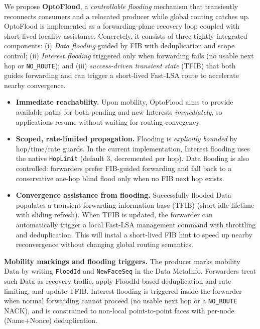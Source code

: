 We propose \textbf{OptoFlood}, a \emph{controllable flooding} mechanism that transiently reconnects consumers and a relocated producer while global routing catches up. OptoFlood is implemented as a forwarding-plane recovery loop coupled with short-lived locality assistance. Concretely, it consists of three tightly integrated components: (i) \emph{Data flooding} guided by FIB with deduplication and scope control; (ii) \emph{Interest flooding} triggered only when forwarding fails (no usable next hop or \texttt{NO\_ROUTE}); and (iii) \emph{success-driven transient state} (TFIB) that both guides forwarding and can trigger a short-lived Fast-LSA route to accelerate nearby convergence.

\begin{itemize}
  \item \textbf{Immediate reachability.} Upon mobility, OptoFlood aims to provide available paths for both pending and new Interests \emph{immediately}, so applications resume without waiting for routing convegency.
  \item \textbf{Scoped, rate-limited propagation.} Flooding is \emph{explicitly bounded} by hop/time/rate guards. In the current implementation, Interest flooding uses the native \texttt{HopLimit} (default 3, decremented per hop). Data flooding is also controlled: forwarders prefer FIB-guided forwarding and fall back to a conservative one-hop blind flood only when no FIB next hop exists.
  \item \textbf{Convergence assistance from flooding.} Successfully flooded Data populates a transient forwarding information base (TFIB) (short idle lifetime with sliding refresh). When TFIB is updated, the forwarder can automatically trigger a local Fast-LSA management command with throttling and deduplication. This will instal a short-lived FIB hint to speed up nearby reconvergence without changing global routing semantics.
\end{itemize}

\noindent\textbf{Mobility markings and flooding triggers.}
The producer marks mobility Data by writing \texttt{FloodId} and \texttt{NewFaceSeq} in the Data MetaInfo. Forwarders treat such Data as recovery traffic, apply FloodId-based deduplication and rate limiting, and update TFIB. Interest flooding is triggered inside the forwarder when normal forwarding cannot proceed (no usable next hop or a \texttt{NO\_ROUTE} NACK), and is constrained to non-local point-to-point faces with per-node (Name+Nonce) deduplication.


